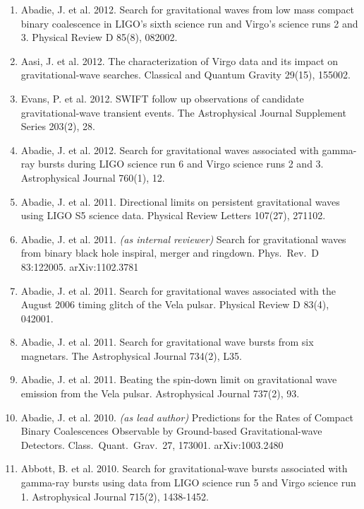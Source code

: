 \documentclass[margin,line]{res}
\begin{document}
\begin{resume}
\begin{enumerate}
\item Abadie, J. et al. 2012. Search for gravitational waves from low mass compact binary coalescence in LIGO's sixth science run and Virgo's science runs 2 and 3. Physical Review D 85(8), 082002.

\item Aasi, J. et al. 2012. The characterization of Virgo data and its impact on gravitational-wave searches. Classical and Quantum Gravity 29(15), 155002.

\item Evans, P. et al. 2012. SWIFT follow up observations of candidate gravitational-wave transient events. The Astrophysical Journal Supplement Series 203(2), 28. 

\item Abadie, J. et al. 2012. Search for gravitational waves associated with gamma-ray bursts during LIGO science run 6 and Virgo science runs 2 and 3. Astrophysical Journal 760(1), 12. 

\item Abadie, J. et al. 2011. Directional limits on persistent gravitational waves using LIGO S5 science data. Physical Review Letters 107(27),  271102. 

\item  Abadie, J. et al.  2011. {\it (as internal reviewer)}  Search for gravitational waves from binary black hole inspiral, merger and ringdown.  Phys.~Rev.~D 83:122005. arXiv:1102.3781

\item Abadie, J. et al. 2011. Search for gravitational waves associated with the August 2006 timing glitch of the Vela pulsar. Physical Review D 83(4), 042001.

\item Abadie, J. et al. 2011. Search for gravitational wave bursts from six magnetars. The Astrophysical Journal 734(2), L35.

\item Abadie, J. et al. 2011. Beating the spin-down limit on gravitational wave emission from the Vela pulsar. Astrophysical Journal 737(2),  93. 

\item  Abadie, J. et al. 2010.  {\it (as lead author)}  Predictions for the Rates of Compact Binary Coalescences Observable by Ground-based Gravitational-wave Detectors.  Class.~Quant.~Grav.~27, 173001. arXiv:1003.2480  

\item Abbott, B. et al. 2010. Search for gravitational-wave bursts associated with gamma-ray bursts using data from LIGO science run 5 and Virgo science run 1. Astrophysical Journal 715(2), 1438-1452. 


\end{enumerate}
\end{resume}
\end{document}
